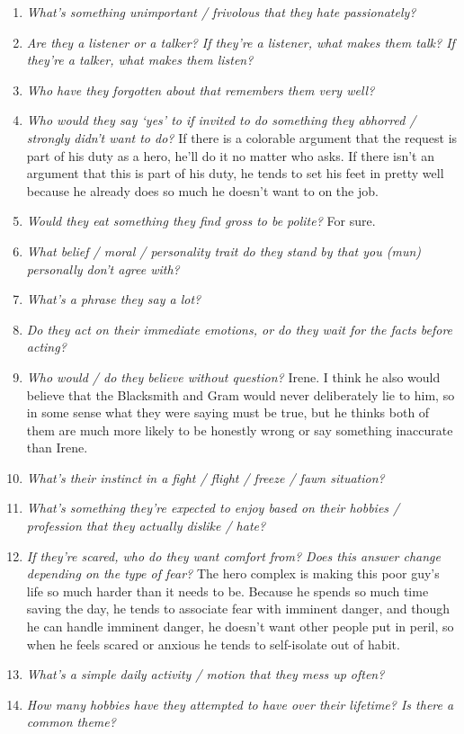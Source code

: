 \begin{enumerate}
    \item\textit{What’s something unimportant / frivolous that they hate passionately?} 
    \item\textit{Are they a listener or a talker? If they’re a listener, what makes them talk? If they’re a talker, what makes them listen?}
    \item\textit{Who have they forgotten about that remembers them very well?}
    \item\textit{Who would they say ‘yes’ to if invited to do something they abhorred / strongly didn’t want to do?} If there is a colorable argument that the request is part of his duty as a hero, he'll do it no matter who asks. If there isn't an argument that this is part of his duty, he tends to set his feet in pretty well because he already does so much he doesn't want to on the job.
    \item\textit{Would they eat something they find gross to be polite?}
        For sure.
    \item\textit{What belief / moral / personality trait do they stand by that you (mun) personally don’t agree with?}
    \item\textit{What’s a phrase they say a lot?}
    \item\textit{Do they act on their immediate emotions, or do they wait for the facts before acting?}
    \item\textit{Who would / do they believe without question?}
        Irene. I think he also would believe that the Blacksmith and Gram would never deliberately lie to him, so in some sense what they were saying must be true, but he thinks both of them are much more likely to be honestly wrong or say something inaccurate than Irene.
    \item\textit{What’s their instinct in a fight / flight / freeze / fawn situation?} 
    \item\textit{What’s something they’re expected to enjoy based on their hobbies / profession that they actually dislike / hate?}
    \item\textit{If they’re scared, who do they want comfort from? Does this answer change depending on the type of fear?}
        The hero complex is making this poor guy's life so much harder than it needs to be. Because he spends so much time saving the day, he tends to associate fear with imminent danger, and though he can handle imminent danger, he doesn't want other people put in peril, so when he feels scared or anxious he tends to self-isolate out of habit. 
    \item\textit{What’s a simple daily activity / motion that they mess up often?}
    \item\textit{How many hobbies have they attempted to have over their lifetime? Is there a common theme?}
  \end{enumerate}